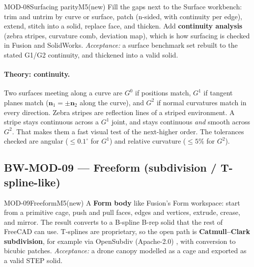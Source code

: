 \begin{epic}{MOD-08}{Surfacing parity}{M5}{\stTodo}{(new)}
Fill the gaps next to the Surface workbench: trim and untrim by curve or surface, patch (n-sided, with
continuity per edge), extend, stitch into a solid, replace face, and thicken. Add \textbf{continuity
analysis} (zebra stripes, curvature comb, deviation map), which is how surfacing is checked in Fusion and
SolidWorks.
\emph{Acceptance:} a surface benchmark set rebuilt to the stated G1/G2 continuity, and thickened into a
valid solid.
\end{epic}

\paragraph{Theory: continuity.} Two surfaces meeting along a curve are $G^0$ if positions match, $G^1$ if
tangent planes match ($\mathbf n_1=\pm\mathbf n_2$ along the curve), and $G^2$ if normal curvatures match in
every direction. Zebra stripes are reflection lines of a striped environment. A stripe stays continuous
across a $G^1$ joint, and stays continuous \emph{and} smooth across $G^2$. That makes them a fast visual test
of the next-higher order. The tolerances checked are angular ($\le0.1^\circ$ for $G^1$) and relative curvature
($\le5\%$ for $G^2$).

\subsection{BW-MOD-09 --- Freeform (subdivision / T-spline-like)}

\begin{epic}{MOD-09}{Freeform}{M5}{\stTodo}{(new)}
A \textbf{Form body} like Fusion's Form workspace: start from a primitive cage, push and pull faces, edges and
vertices, extrude, crease, and mirror. The result converts to a B-spline B-rep solid that the rest of FreeCAD
can use. T-splines are proprietary, so the open path is \textbf{Catmull--Clark subdivision}, for example via
OpenSubdiv (Apache-2.0) \verify, with conversion to bicubic patches.
\emph{Acceptance:} a drone canopy modelled as a cage and exported as a valid STEP solid.
\end{epic}

